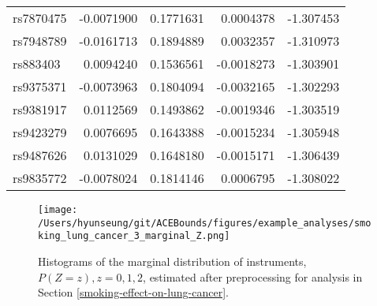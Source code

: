 \documentclass[
]{article}
\theoremstyle{plain}
\begin{document}
{\begin{longtable}[t]{lrrrr}
rs7870475 & -0.0071900 & 0.1771631 & 0.0004378 & -1.307453\\
rs7948789 & -0.0161713 & 0.1894889 & 0.0032357 & -1.310973\\
rs883403 & 0.0094240 & 0.1536561 & -0.0018273 & -1.303901\\
rs9375371 & -0.0073963 & 0.1804094 & -0.0032165 & -1.302293\\
\addlinespace
rs9381917 & 0.0112569 & 0.1493862 & -0.0019346 & -1.303519\\
rs9423279 & 0.0076695 & 0.1643388 & -0.0015234 & -1.305948\\
rs9487626 & 0.0131029 & 0.1648180 & -0.0015171 & -1.306439\\
rs9835772 & -0.0078024 & 0.1814146 & 0.0006795 & -1.308022\\*
\end{longtable}

\begin{figure}[H]
  \center
  \texttt{[image: /Users/hyunseung/git/ACEBounds/figures/example\_analyses/smoking\_lung\_cancer\_3\_marginal\_Z.png]}
  \caption{Histograms of the marginal distribution of instruments, $P(Z = z), z=0,1,2$, estimated after preprocessing for analysis in Section \ref{smoking-effect-on-lung-cancer}.}
  \label{fig:marginal-distribution-of-instruments-lung-cancer}
\end{figure}

}
\end{document}
